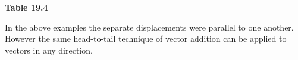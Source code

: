     \begin{center}{\small\bfseries Table 19.4}\end{center}
    
    \addtocounter{footnote}{-0}
    
    \par
  
        
        \label{m38813*id188761}In the above examples the separate displacements were parallel to one
another. However the same head-to-tail technique of vector addition
can be applied to vectors in any direction.\par 
        
    
      
    
    \setlength\mytablespace{6\tabcolsep}
    \addtolength\mytablespace{4\arrayrulewidth}
    \setlength\mytablewidth{\linewidth}
        
    
    \setlength\mytableroom{\mytablewidth}
    \addtolength\mytableroom{-\mytablespace}
    
    \setlength\myfixedwidth{0pt}
    \setlength\mystarwidth{\mytableroom}
        \addtolength\mystarwidth{-\myfixedwidth}
        \divide{}
        
    
            
    
